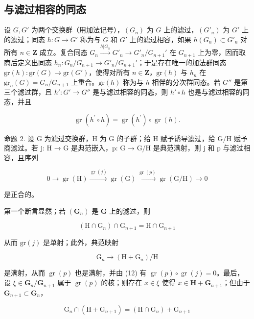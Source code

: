 \subsection{与滤过相容的同态}

	设 \(G, G'\) 为两个交换群（用加法记号），\((G_n)\) 为 \(G\) 上的滤过，\((G'_n)\) 为 \(G'\) 上的滤过；同态 \(h: G \to G'\) 称为与 \(G\) 和 \(G'\) 上的滤过相容，如果 \(h(G_n) \subset G'_n\) 对所有 \(n \in \mathbf{Z}\) 成立。复合同态 \(G_n \xrightarrow{h|G_n} G'_n \longrightarrow G'_n / G_{n+1}'\) 在 \(G_{n+1}\) 上为零，因而取商后定义出同态 \(h_n: G_n / G_{n+1} \to G'_n / G_{n+1}'\)；于是存在唯一的加法群同态 \(\text{gr}(h): \text{gr}(G) \to \text{gr}(G')\)，使得对所有 \(n \in \mathbf{Z}\)，\(\text{gr}(h)\) 与 \(h_n\) 在 \(\text{gr}_n(G) = G_n / G_{n+1}\) 上重合。\(\text{gr}(h)\) 称为与 \(h\) 相伴的分次群同态。若 \(G''\) 是第三个滤过群，且 \(h': G' \to G''\) 是与滤过相容的同态，则 \(h' \circ h\) 也是与滤过相容的同态，并且

\[
\operatorname{gr} (h ^ {\prime} \circ h) = \operatorname{gr} (h ^ {\prime}) \circ \operatorname{gr} (h).\tag{12}
\]

命题 2. 设 G 为滤过交换群，H 为 G 的子群；给 H 赋予诱导滤过，给 G/H 赋予商滤过。若 j: H → G 是典范嵌入，p: G → G/H 是典范满射，则 j 和 p 与滤过相容，且序列

\[
0 \longrightarrow \operatorname{gr} (\mathrm{H}) \xrightarrow {\operatorname{gr} (j)} \operatorname{gr} (\mathrm{G}) \xrightarrow {\operatorname{gr} (p)} \operatorname{gr} (\mathrm{G} / \mathrm{H}) \longrightarrow 0\tag{13}
\]

是正合的。

第一个断言显然；若 \((\mathbf{G}_n)\) 是 \(\mathbf{G}\) 上的滤过，则

\[
\left(\mathrm{H} \cap \mathrm{G} _ {n}\right) \cap \mathrm{G} _ {n + 1} = \mathrm{H} \cap \mathrm{G} _ {n + 1}
\]

从而 \(\mathrm{gr}(j)\) 是单射；此外，典范映射

\[
\mathrm{G} _ {n} \rightarrow (\mathrm{H} + \mathrm{G} _ {n}) / \mathrm{H}
\]

是满射，从而 \(\operatorname{gr}(p)\) 也是满射，并由 (12) 有 \(\operatorname{gr}(p) \circ \operatorname{gr}(j) = 0\)。最后，设 \(\xi \in \mathbf{G}_n / \mathbf{G}_{n+1}\) 属于 \(\operatorname{gr}(p)\) 的核；则存在 \(x \in \xi\) 使得 \(x \in \mathbf{H} + \mathbf{G}_{n+1}\)；但由于 \(\mathbf{G}_{n+1} \subset \mathbf{G}_n\)，

\[
\mathrm{G} _ {n} \cap (\mathrm{H} + \mathrm{G} _ {n + 1}) = (\mathrm{H} \cap \mathrm{G} _ {n}) + \mathrm{G} _ {n + 1}
\]

